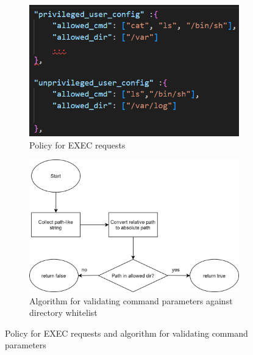 \begin{figure}[!htb] 
    \begin{subfigure}[b]{0.3\linewidth}
      \centering
      \includegraphics[width=0.9\linewidth]{images/exec_policy.png} 
      \caption{Policy for EXEC requests} 
      \label{fig:exec_policy} 
      \vspace{4ex}
    \end{subfigure}%
    \begin{subfigure}[b]{0.6\linewidth}
      \centering
      \includegraphics[width=0.9\linewidth]{images/algo_for_path_checking.png} 
      \caption{Algorithm for validating command parameters against directory whitelist} 
      \label{fig:algo_for_path_checking} 
      \vspace{4ex}
    \end{subfigure} 
    \caption{Policy for EXEC requests and algorithm for validating command parameters}
    \label{fig3} 
\end{figure}


